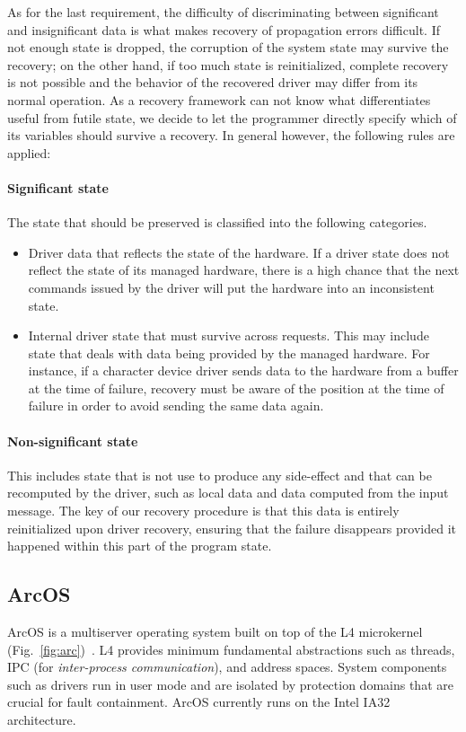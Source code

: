 \documentclass[times, 10pt, twocolumn]{article}
\begin{document}
As for the last requirement, the difficulty of discriminating between significant and insignificant data is what makes recovery of propagation errors difficult. If not enough state is dropped, the corruption of the system state may survive the recovery; on the other hand, if too much state is reinitialized, complete recovery is not possible and the behavior of the recovered driver may differ from its normal operation. As a recovery framework can not know what differentiates useful from futile state, we decide to let the programmer directly specify which of its variables should survive a recovery. In general however, the following rules are applied:

\paragraph{Significant state}
The state that should be preserved is classified into the following categories.
\begin{itemize}
\item Driver data that reflects the state of the hardware.  If a driver state does not reflect the state of its managed hardware, there is a high chance that the next commands issued by the driver will put the hardware into an inconsistent state.
\item Internal driver state that must survive across requests. This may include state that deals with data being provided by the managed hardware. For instance, if a character device driver sends data to the hardware from a buffer at the time of failure, recovery must be aware of the position at the time of failure in order to avoid sending the same data again.
\end{itemize}

\paragraph{Non-significant state}
This includes state that is not use to produce any side-effect and that can be recomputed by the driver, such as local data and data computed from the input message. The key of our recovery procedure is that this data is entirely reinitialized upon driver recovery, ensuring that the failure disappears provided it happened within this part of the program state.

\subsection{ArcOS}
\label{s:arc}
ArcOS is a multiserver operating system built on top of the L4 microkernel (Fig.~\ref{fig:arc})~\cite{L4X2}.  L4 provides minimum fundamental abstractions such as threads, IPC (for \emph{inter-process communication}), and address spaces. System components such as drivers run in user mode and are isolated by protection domains that are crucial for fault containment. ArcOS currently runs on the Intel IA32 architecture.
\end{document}
